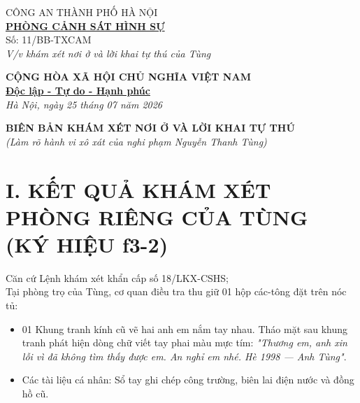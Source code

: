 \documentclass[12pt,a4paper]{article}
\begin{document}
\noindent
\begin{minipage}[t]{0.45\textwidth}
    \begin{center}
        \small
        CÔNG AN THÀNH PHỐ HÀ NỘI\\
        \textbf{\underline{PHÒNG CẢNH SÁT HÌNH SỰ}}\\[0.1cm]
        Số: 11/BB-TXCAM\\
        \textit{V/v khám xét nơi ở và lời khai tự thú của Tùng}
    \end{center}
\end{minipage}
\hfill
\begin{minipage}[t]{0.52\textwidth}
    \begin{center}
        \small
        \textbf{CỘNG HÒA XÃ HỘI CHỦ NGHĨA VIỆT NAM}\\
        \textbf{\underline{Độc lập - Tự do - Hạnh phúc}}\\[0.1cm]
        \textit{Hà Nội, ngày 25 tháng 07 năm 2026}
    \end{center}
\end{minipage}

\vspace{0.6cm}

\begin{center}
    \textbf{\large BIÊN BẢN KHÁM XÉT NƠI Ở VÀ LỜI KHAI TỰ THÚ}\\
    \textit{(Làm rõ hành vi xô xát của nghi phạm Nguyễn Thanh Tùng)}
\end{center}

\vspace{0.3cm}

\section*{I. KẾT QUẢ KHÁM XÉT PHÒNG RIÊNG CỦA TÙNG (KÝ HIỆU f3-2)}
\noindent Căn cứ Lệnh khám xét khẩn cấp số 18/LKX-CSHS;\\
Tại phòng trọ của Tùng, cơ quan điều tra thu giữ 01 hộp các-tông đặt trên nóc tủ:
\begin{itemize}[leftmargin=1.5cm]
    \item 01 Khung tranh kính cũ vẽ hai anh em nắm tay nhau. Tháo mặt sau khung tranh phát hiện dòng chữ viết tay phai màu mực tím: \textit{"Thương em, anh xin lỗi vì đã không tìm thấy được em. An nghỉ em nhé. Hè 1998 — Anh Tùng"}.
    \item Các tài liệu cá nhân: Sổ tay ghi chép công trường, biên lai điện nước và đồng hồ cũ.
\end{itemize}
\end{document}
